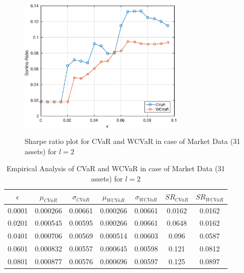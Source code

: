 \documentclass[12pt]{article}
\numberwithin{equation}{section}
\begin{document}
\begin{figure}[!h]
    \centering
   
    \includegraphics[height=7.0cm,width=0.7\textwidth]{CVaR/bse30_market/sr_cvar_2.eps}

   \caption{Sharpe ratio plot for CVaR and WCVaR in case of Market Data (31 assets) for $l=2$}
   \label{fig:6.1}
\end{figure}

\begin{table}[!h]
    \centering
    \captionsetup{justification=centering}

   \begin{tabular}{||c|c|c|c|c|c|c||}
   \hline
  
$\epsilon$ & $\mu_{CVaR}$ & $\sigma_{CVaR}$ & $\mu_{WCVaR}$ & $\sigma_{WCVaR}$ & $SR_{CVaR}$ & $SR_{WCVaR}$\\
  
  \hline
0.0001 & 0.000266 & 0.00661 & 0.000266 & 0.00661 & 0.0162 & 0.0162 \\
0.0201 & 0.000545 & 0.00595 & 0.000266 & 0.00661 & 0.0648 & 0.0162 \\
0.0401 & 0.000706 & 0.00569 & 0.000514 & 0.00603 & 0.096 & 0.0587 \\
0.0601 & 0.000832 & 0.00557 & 0.000645 & 0.00598 & 0.121 & 0.0812 \\
0.0801 & 0.000877 & 0.00576 & 0.000696 & 0.00597 & 0.125 & 0.0897 \\
  \hline
\end{tabular}
    \caption{Empirical Analysis of CVaR and WCVaR in case of Market Data (31 assets) for $l=2$}
    \label{tab:6.1}
\end{table}
\end{document}
